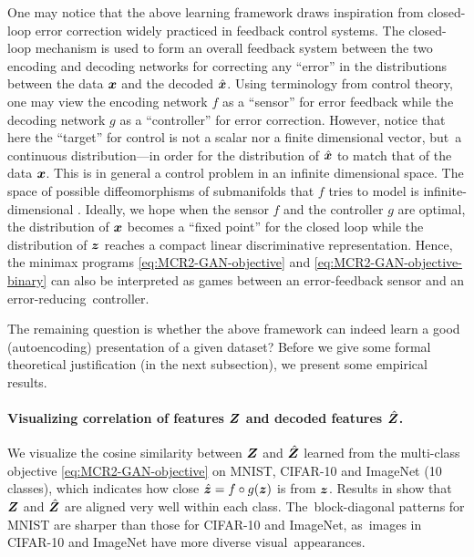 \documentclass[../../book-main.tex]{subfiles}
\begin{document}
One may notice that the above learning framework draws inspiration from closed-loop error correction widely practiced in feedback control systems. The closed-loop mechanism is used to form an overall feedback system between the two encoding and decoding networks for correcting any  ``error'' in the distributions between the data $\bm{x}$ and the decoded $\hat {\bm{x}}$. Using terminology from control theory, one may view the encoding network $f$ as a ``sensor'' for error feedback while the decoding network $g$ as a ``controller'' for error correction. However, notice that here the ``target'' for control is not a scalar nor a finite dimensional vector, but~a continuous distribution---in order for the distribution of $\hat {\bm{x}}$ to match that of the data $\bm{x}$. This is in general a control problem in an infinite dimensional space. The space of possible diffeomorphisms of submanifolds that $f$ tries to model is infinite-dimensional \cite{Lee2002IntroductionTS}. Ideally, we hope when the sensor $f$ and the controller $g$ are optimal, the distribution of $\bm{x}$ becomes a ``fixed point'' for the closed loop while the distribution of $\bm{z}$ reaches a compact linear discriminative representation. Hence, the minimax programs \eqref{eq:MCR2-GAN-objective} and \eqref{eq:MCR2-GAN-objective-binary} can also be interpreted as games between an error-feedback sensor and an error-reducing~controller.

The remaining question is whether the above framework can indeed learn a good (autoencoding) presentation of a given dataset? Before we give some formal theoretical justification (in the next subsection), we present some empirical results. 

\paragraph{Visualizing correlation of features $\bm{Z}$ and decoded features $\hat {\bm{Z}}$.} We visualize the cosine similarity between $\bm{Z}$ and $\hat{\bm{Z}}$ learned from the multi-class objective \eqref{eq:MCR2-GAN-objective} on MNIST, CIFAR-10 and ImageNet (10 classes), which indicates how close $\hat{\bm{z}} = f\circ g(\bm{z})$ is from $\bm{z}$. Results in  show that $\bm{Z}$ and $\hat{\bm{Z}}$ are aligned very well within each class. The~block-diagonal patterns for MNIST are sharper than those for CIFAR-10 and ImageNet, as~images in CIFAR-10 and ImageNet have more diverse visual~appearances.
\end{document}
